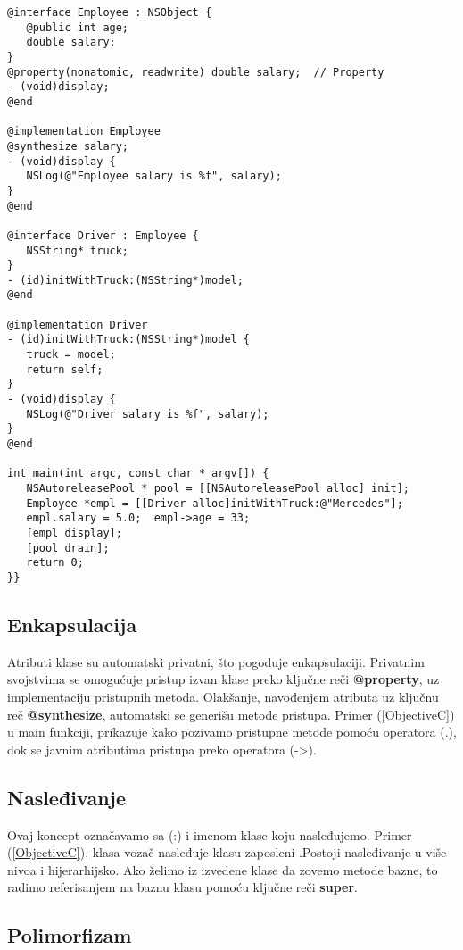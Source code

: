 \documentclass[a4paper]{article}
\begin{document}
\begin{lstlisting}[caption={Primer koda u Objective C jeziku},frame=single, label=ObjectiveC]
@interface Employee : NSObject {
   @public int age;
   double salary;
}
@property(nonatomic, readwrite) double salary;  // Property
- (void)display;
@end

@implementation Employee
@synthesize salary; 
- (void)display {
   NSLog(@"Employee salary is %f", salary);
}
@end

@interface Driver : Employee {
   NSString* truck;
}
- (id)initWithTruck:(NSString*)model;
@end

@implementation Driver
- (id)initWithTruck:(NSString*)model {
   truck = model;
   return self;
}
- (void)display {
   NSLog(@"Driver salary is %f", salary);
}
@end

int main(int argc, const char * argv[]) {
   NSAutoreleasePool * pool = [[NSAutoreleasePool alloc] init];
   Employee *empl = [[Driver alloc]initWithTruck:@"Mercedes"];
   empl.salary = 5.0;  empl->age = 33;
   [empl display];
   [pool drain];
   return 0;
}}
\end{lstlisting}

\subsection{Enkapsulacija}
\label{subsec:ObjCEnkapsulacija}

Atributi klase su automatski privatni, što pogoduje enkapsulaciji. Privatnim svojstvima se omogućuje pristup izvan klase preko ključne reči \textbf{@property}, uz implementaciju pristupnih metoda. Olakšanje, navođenjem atributa uz ključnu reč \textbf{@synthesize}, automatski se generišu metode pristupa.  Primer (\ref{ObjectiveC}) u main funkciji, prikazuje kako pozivamo pristupne metode pomoću operatora (.), dok se javnim atributima pristupa preko operatora (->).

\subsection{Nasleđivanje}
\label{subsec:ObjCNasledjivanje}

Ovaj koncept označavamo sa (:) i imenom klase koju nasleđujemo. Primer (\ref{ObjectiveC}), klasa vozač nasleđuje klasu zaposleni .Postoji nasleđivanje u više nivoa i hijerarhijsko. Ako želimo iz izvedene klase da zovemo metode bazne, to radimo referisanjem na baznu klasu pomoću ključne reči \textbf{super}.

\subsection{Polimorfizam}
\label{subsec:ObjCPolimorfizam}
\end{document}
